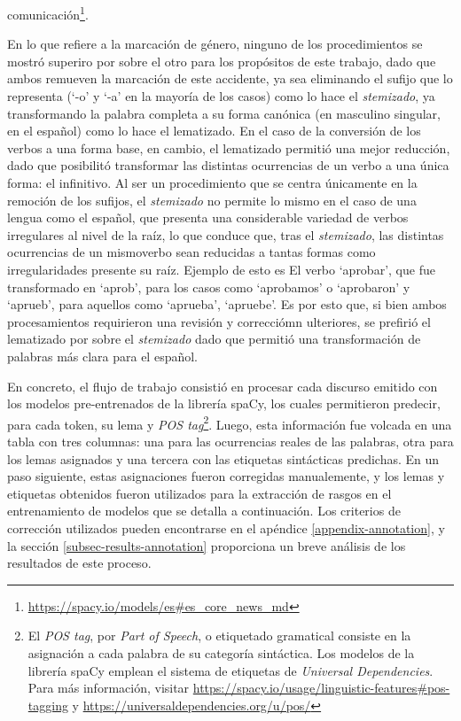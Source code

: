 comunicación\footnote{\url{https://spacy.io/models/es\#es_core_news_md}}.
\par
En lo que refiere a la marcación de género, ninguno de los procedimientos se mostró
superiro por sobre el otro para los propósitos de este trabajo, dado que ambos
remueven la marcación de este accidente, ya sea eliminando el sufijo que lo
representa (`-o' y `-a' en la mayoría de los casos) como lo hace el
\textit{stemizado}, ya transformando la palabra completa a su forma canónica
(en masculino singular, en el español) como lo hace el lematizado. En el caso
de la conversión de los verbos a una forma base, en cambio, el lematizado permitió
una mejor reducción, dado que posibilitó transformar las distintas ocurrencias
de un verbo a una única forma: el infinitivo. Al ser un procedimiento que se
centra únicamente en la remoción de los sufijos, el \textit{stemizado} no permite
lo mismo en el caso de una lengua como el español, que presenta una considerable
variedad de verbos irregulares al nivel de la raíz, lo que conduce que, tras el
\textit{stemizado}, las distintas ocurrencias de un mismoverbo sean reducidas
a tantas formas como irregularidades presente su raíz. Ejemplo de esto es El
verbo `aprobar', que fue transformado en `aprob', para los casos como
`aprobamos' o `aprobaron' y `aprueb', para aquellos como `aprueba',
`apruebe'. Es por esto que, si bien ambos procesamientos requirieron una revisión
y correcciómn ulteriores, se prefirió el lematizado por sobre el \textit{stemizado}
dado que permitió una transformación de palabras más clara para el español.
\par
En concreto, el flujo de trabajo consistió en procesar cada discurso emitido
con los modelos pre-entrenados de la librería spaCy, los cuales permitieron
predecir, para cada token, su lema y \textit{POS tag}\footnote{El
\textit{POS tag}, por \textit{Part of Speech}, o etiquetado gramatical consiste
en la asignación a cada palabra de su categoría sintáctica. Los modelos de la
librería spaCy emplean el sistema de etiquetas de \textit{Universal Dependencies}.
Para más información, visitar
\url{https://spacy.io/usage/linguistic-features\#pos-tagging}
y \url{https://universaldependencies.org/u/pos/}}. Luego, esta
información fue volcada en una tabla con tres columnas: una para las ocurrencias
reales de las palabras, otra para los lemas asignados y una tercera con las etiquetas
sintácticas predichas. En un paso siguiente, estas asignaciones fueron corregidas
manualemente, y los lemas y etiquetas obtenidos fueron utilizados para la
extracción de rasgos en el entrenamiento de modelos que se detalla a continuación.
Los criterios de corrección utilizados pueden encontrarse en el apéndice
\ref{appendix-annotation}, y la sección \ref{subsec-results-annotation}
proporciona un breve análisis de los resultados de este proceso.
